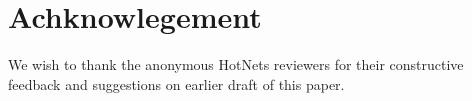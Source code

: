 \section{Achknowlegement}
\label{sec:ack}
We wish to thank the anonymous HotNets reviewers for their constructive
feedback and suggestions on earlier draft of this paper.
